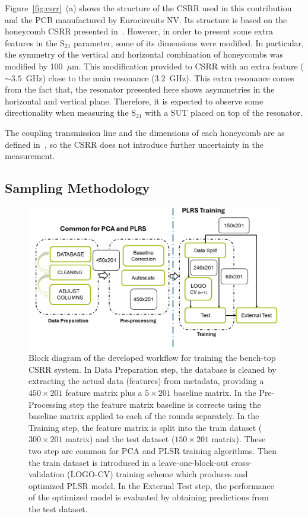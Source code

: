 \documentclass[journal,twoside,web]{ieeecolor}
\begin{document}
Figure~\ref{fig:csrr}~(a) shows the structure of the CSRR used in this contribution and the PCB manufactured by Eurocircuits NV. Its structure is based on the honeycomb CSRR presented in~\cite{Omer2020}. However, in order to present some extra features in the S$_{21}$ parameter, some of its dimensions were modified. In particular, the symmetry of the vertical and horizontal combination of honeycombs was modified by 100~$\mu$m. This modification provided to CSRR with an extra feature ($\sim3.5$~GHz) close to the main resonance ($3.2$~GHz). This extra resonance comes from the fact that, the resonator presented here shows asymmetries in the horizontal and vertical plane. Therefore, it is expected to observe some directionality when measuring the S$_{21}$ with a SUT placed on top of the resonator.

The coupling transmission line and the dimensions of each honeycomb are as defined in~\cite{Omer2020}, so the CSRR does not introduce further uncertainty in the measurement.

\subsection{Sampling Methodology}
\label{ssec:samplingMethod}

\begin{figure}[!t]
	\centering
	\includegraphics [trim = 0mm 0mm 0mm 0mm, clip, width=1.5\columnwidth]{figures/fig6_3.png}
	\caption{Block diagram of the developed workflow for training the bench-top CSRR system. In Data Preparation step, the database is cleaned by extracting the actual data (features) from metadata, providing a $450\times201$ feature matrix plus a $5\times201$ baseline matrix. In the Pre-Processing step the feature matrix baseline is correcte using the baseline matrix applied to each of the rounds separately. In the Training step, the feature matrix is split into the train dataset ($300\times201$ matrix) and the test dataset ($150\times201$ matrix). These two step are common for PCA and PLSR training algorithms. Then the train dataset is introduced in a leave-one-block-out cross-validation (LOGO-CV) training scheme which produces and optimized PLSR model. In the External Test step, the performance of the optimized model is evaluated by obtaining predictions from the test dataset.}
	\label{fig:workflow}
	\vspace{-0.3cm}
\end{figure}
\end{document}
